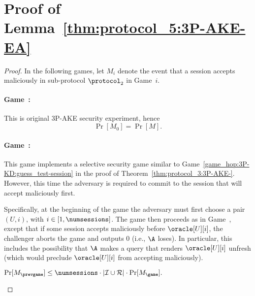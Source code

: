 \section{Proof of Lemma~\ref{thm:protocol_5:3P-AKE-EA}}\label{sec:proof_of_EA_protocol_5}

\EAlemma*
\normalsize

\begin{proof}

In the following games, 
let $M_i$ denote the event that a session accepts maliciously in sub-protocol $\protocol_2$ in Game~$i$. 

\setcounter{gamehop}{0}
\paragraph{Game~\game:}
This is original 3P-AKE security experiment,
hence
\begin{equation}
	\Pr[M_0] = \Pr[M].
\end{equation}


\newgame
\paragraph{Game~\game:}\label{game_hop:3P-AKE:P5:EA:guess_MA_target}
This game implements a selective security game  similar to  Game~\ref{game_hop:3P-KD:guess_test-session} in the proof of Theorem~\ref{thm:protocol_3:3P-AKE-}.
However,
this time the adversary is required to commit to the session that will accept maliciously first.

Specifically,
at the beginning of the game the adversary must first choose a pair $(U,i)$,
with $i \in [1, \numsessions]$.
The game then proceeds as in Game~\prevgame{},
except that if some session accepts maliciously before $\oracle[U][i]$,
the challenger aborts the game and outputs $0$ 
(i.e., $\A$ loses).
In particular,
this includes the possibility that $\A$ makes a query that renders $\oracle[U][i]$ unfresh
(which would preclude $\oracle[U][i]$ from accepting maliciously).
\begin{lemma}\label{lemma:3P-AKE-EA:selective-security:EA-target}
$
	\Pr[M_{\prevgame}] 
	\leq \numsessions \cdot | \mathcal{I} \cup \mathcal{R} | \cdot \Pr[M_{\game}].
$
\end{lemma}


\end{proof}
